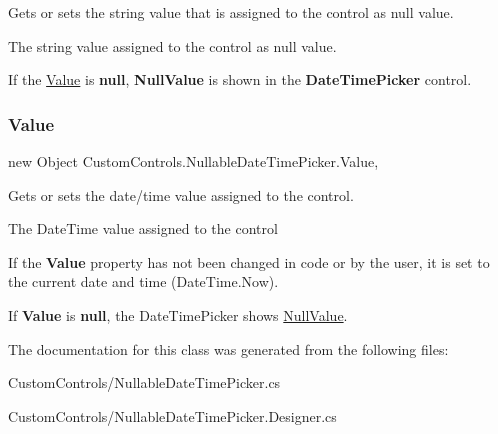 Gets or sets the string value that is assigned to the control as null value. 

The string value assigned to the control as null value.

If the \mbox{\hyperlink{class_custom_controls_1_1_nullable_date_time_picker_a10ca9af18d1ba8e6985257fcf374748b}{Value}} is {\bfseries null}, {\bfseries Null\+Value} is shown in the {\bfseries Date\+Time\+Picker} control. \mbox{\label{class_custom_controls_1_1_nullable_date_time_picker_a10ca9af18d1ba8e6985257fcf374748b}} 
\subsubsection{\texorpdfstring{Value}{Value}}
{\footnotesize\ttfamily new Object Custom\+Controls.\+Nullable\+Date\+Time\+Picker.\+Value\hspace{0.3cm}{\ttfamily [get]}, {\ttfamily [set]}}



Gets or sets the date/time value assigned to the control. 

The Date\+Time value assigned to the control 

If the {\bfseries Value} property has not been changed in code or by the user, it is set to the current date and time (Date\+Time.\+Now).

If {\bfseries Value} is {\bfseries null}, the Date\+Time\+Picker shows \mbox{\hyperlink{class_custom_controls_1_1_nullable_date_time_picker_a9efcb8f7340f813306a8e2ca388e156e}{Null\+Value}}.

The documentation for this class was generated from the following files\+:\begin{DoxyCompactItemize}
\item 
Custom\+Controls/Nullable\+Date\+Time\+Picker.\+cs\item 
Custom\+Controls/Nullable\+Date\+Time\+Picker.\+Designer.\+cs\end{DoxyCompactItemize}

